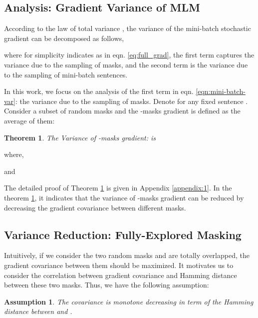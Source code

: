 \documentclass{article} \usepackage{iclr2021_conference,times}
\theoremstyle{plain}
\newtheorem{assumption}{Assumption}
\newtheorem{theorem}{Theorem}
\begin{document}
\vspace{-2mm}
\subsection{Analysis: Gradient Variance of MLM}
\vspace{-2mm}
\label{sec:mlm_variance}
According to the law of total variance \citep{neil_acourse_in_probability}, the variance of the mini-batch stochastic gradient  can be decomposed as follows, 


where for simplicity  indicates  as in eqn. \ref{eq:full_grad}, the first term captures the variance due to the sampling of masks, and the second term is the variance due to the sampling of mini-batch sentences.



In this work, we focus on the analysis of the first term in eqn. \ref{eqn:mini-batch-var}: the variance due to the sampling of masks. Denote
 for any fixed sentence . Consider a subset of random masks
 and the -masks gradient is defined as the average of them: 


\begin{theorem}
\label{varmlm}
The Variance of -masks gradient:   is

\end{theorem}
where, 
\vspace{-6mm}

and 
\vspace{-6mm}

The detailed proof of Theorem \ref{varmlm} is given in Appendix \ref{appendix:1}. In the theorem \ref{varmlm}, it indicates that the variance of -masks gradient can be reduced by decreasing the gradient covariance between different masks.
\vspace{-2mm}
\subsection{Variance Reduction: Fully-Explored Masking}
\vspace{-2mm}










Intuitively, if we consider the two random masks  and  are totally overlapped, the gradient covariance between them should be maximized. It motivates us to consider the correlation between gradient covariance and Hamming distance between these two masks. Thus, we have the following assumption:
\begin{assumption}\label{asmp:cov-hamming}
	The covariance  is monotone decreasing in term of the Hamming distance between  and .
\end{assumption}
\end{document}
